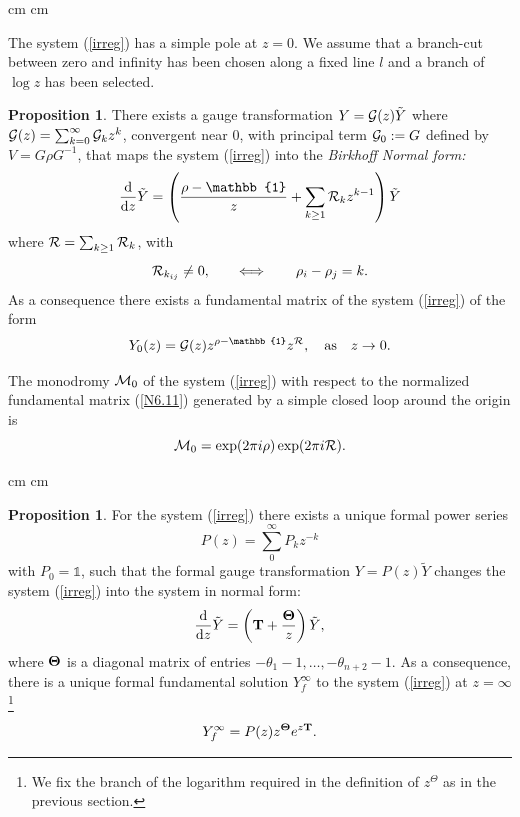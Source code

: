 \documentclass[12pt]{article}
\def\ddz{{{\rm d}\over{\rm d} z}}
\def\iff{\Longleftrightarrow}
\newcommand{\ID}{\mathbb{1}}
\theoremstyle{definition}
\theoremstyle{theorem}
\newtheorem{prop}[df]{Proposition}
\begin{document}
 cm
 cm

The system (\ref{irreg}) has a simple pole at $z=0$. We assume that a 
branch-cut between zero and infinity has been chosen along a fixed
line $l$ and a branch of $\log z$ has been selected. 

\begin{prop}
There exists a gauge transformation
$Y={\cal G}(z)\tilde Y$ where ${\mathcal G}(z)=
\sum_{k=0}^\infty{\cal G}_k z^k$, 
convergent near $0$, with principal term ${\cal G}_0:=G$ defined by 
$V={G}\rho {G}^{-1}$, that maps the system (\ref{irreg}) 
into the {\it Birkhoff Normal form:}
\begin{equation}
\ddz\tilde Y=\left({\rho-\ID\over z} + 
\sum_{k\geq1}{\cal R}_k z^{k-1}\right)\tilde Y
\label{N6.2}
\end{equation}
where ${\cal R}=\sum_{k\geq 1} {\cal R}_k$, with
$$
{\cal R}_{k_{ij}}\neq 0,\qquad\iff\qquad \rho_i-\rho_j=k.
$$
As a consequence there exists a fundamental matrix of the system 
(\ref{irreg}) of the form
\begin{equation}
Y_0(z)={\cal G}(z)z^{\rho-\ID} z^{{\cal R}},\quad\hbox{as}\quad 
 z\rightarrow 0.
\label{N6.11}
\end{equation}
\end{prop}

The monodromy ${\cal M}_0$ of the system (\ref{irreg}) with respect to 
the normalized fundamental matrix (\ref{N6.11}) generated by a simple 
closed loop around the origin is 
$$
{\cal M}_0=\exp(2\pi i\rho)\exp(2\pi i{\cal R}).
$$

 cm
 cm


\begin{prop} For the system (\ref{irreg}) there exists a unique formal
power series
\begin{equation}
P(z)=\sum_0^\infty P_k z^{-k}
\end{equation}
with $P_0=\ID$, such that the formal gauge transformation
$Y=P(z)\tilde Y$ changes the system (\ref{irreg}) into
the system in normal form:
\begin{equation}
\ddz\tilde Y=\left({\bf T}+{{\bf\Theta}\over z}\right)\tilde Y,\label{S1.5}
\end{equation}
where ${\bf\Theta}$ is a diagonal matrix of entries $-\theta_1-1,\dots,
-\theta_{n+2}-1$.
As a consequence, there is a unique formal fundamental solution 
$Y^\infty_f$ to the system (\ref{irreg}) at 
$z=\infty$\footnote{We fix the branch of the logarithm required in
the definition of $z^\Theta$ as in the previous section.}
\begin{equation}
Y^\infty_f= P(z) z^{\bf\Theta} e^{z {\bf T}}.
\label{S2}\end{equation}
\label{S3}\end{prop}
\end{document}
